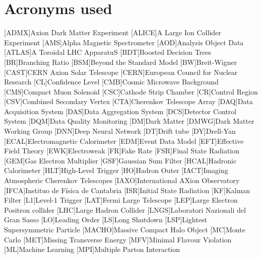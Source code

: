 \documentclass[a4paper, 10pt, openright]{report}
\begin{document}
\chapter*{\huge{Acronyms used}}
\begin{multicols}{2}
\begin{acronym}

[ADMX]{Axion Dark Matter Experiment}
[ALICE]{A Large Ion Collider Experiment}
[AMS]{Alpha Magnetic Spectrometer}
[AOD]{Analysis Object Data}
[ATLAS]{A Toroidal LHC ApparatuS}
[BDT]{Boosted Decision Trees}
[BR]{Branching Ratio}
[BSM]{Beyond the Standard Model}
[BW]{Breit-Wigner}
[CAST]{CERN Axion Solar Telescope}
[CERN]{European Council for Nuclear Research}
[CL]{Confidence Level}
[CMB]{Cosmic Microwave Background}
[CMS]{Compact Muon Solenoid}
[CSC]{Cathode Strip Chamber}
[CR]{Control Region}
[CSV]{Combined Secondary Vertex}
[CTA]{Cherenkov Telescope Array}
[DAQ]{Data Acquisition System}
[DAS]{Data Aggregation System}
[DCS]{Detector Control System}
[DQM]{Data Quality Monitoring}
[DM]{Dark Matter}
[DMWG]{Dark Matter Working Group}
[DNN]{Deep Neural Network}
[DT]{Drift tube}
[DY]{Drell-Yan}
[ECAL]{Electromagnetic Calorimeter}
[EDM]{Event Data Model}
[EFT]{Effective Field Theory}
[EWK]{Electroweak}
[FR]{Fake Rate}
[FSR]{Final State Radiation}
[GEM]{Gas Electron Multiplier}
[GSF]{Gaussian Sum Filter}
[HCAL]{Hadronic Calorimeter}
[HLT]{High-Level Trigger}
[HO]{Hadron Outer}
[IACT]{Imaging Atmospheric Cherenkov Telescopes}
[IAXO]{International AXion Observatory}
[IFCA]{Instituo de F\'{i}sica de Cantabria}
[ISR]{Initial State Radiation}
[KF]{Kalman Filter}
[L1]{Level-1 Trigger}
[LAT]{Fermi Large Telescope}
[LEP]{Large Electron Positron collider}
[LHC]{Large Hadron Collider}
[LNGS]{Laboratori Nazionali del Gran Sasso}
[LO]{Leading Order}
[LS]{Long Shutdown}
[LSP]{Lightest Supersymmetric Particle}
[MACHO]{Massive Compact Halo Object}
[MC]{Monte Carlo}
[MET]{Missing Transverse Energy}
[MFV]{Minimal Flavour Violation}
[ML]{Machine Learning}
[MPI]{Multiple Parton Interaction}

\end{acronym}
\end{multicols}
\end{document}
